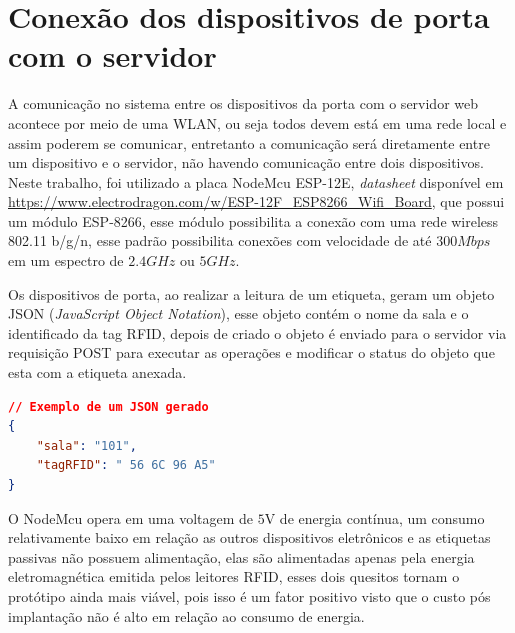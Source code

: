 \section{Conexão dos dispositivos de porta com o servidor}

A comunicação no sistema entre os dispositivos da porta com o servidor web acontece por meio de uma WLAN, ou seja todos devem está em uma rede local e assim poderem se comunicar, entretanto a comunicação será diretamente entre um dispositivo e o servidor,
não havendo comunicação entre dois dispositivos. Neste trabalho, foi utilizado a placa NodeMcu ESP-12E, \textit{datasheet} disponível em \url{https://www.electrodragon.com/w/ESP-12F_ESP8266_Wifi_Board}, %
que possui um módulo ESP-8266, esse módulo possibilita a conexão com uma rede wireless 802.11 b/g/n, esse padrão possibilita conexões com velocidade de até $300Mbps$ em um espectro de $2.4GHz$ ou $5GHz$. %

\par
Os dispositivos de porta, ao realizar a leitura de um etiqueta, geram um objeto JSON (\textit{JavaScript Object Notation}), esse objeto contém o nome da sala e o identificado da tag RFID, depois de criado o objeto é enviado para o servidor via requisição POST para executar as operações e modificar o status do objeto que esta com a etiqueta anexada.

\begin{lstlisting}[language=json,firstnumber=1]
// Exemplo de um JSON gerado
{
    "sala": "101",
    "tagRFID": " 56 6C 96 A5"
}  
\end{lstlisting}

\par
O NodeMcu opera em uma voltagem de $5$V de energia contínua, um consumo relativamente baixo em relação as outros dispositivos eletrônicos e as etiquetas passivas não possuem alimentação, elas são alimentadas apenas pela energia eletromagnética emitida pelos leitores RFID, esses dois quesitos tornam o protótipo ainda mais viável, pois isso é um fator positivo visto que o custo pós implantação não é alto em relação ao consumo de energia.




